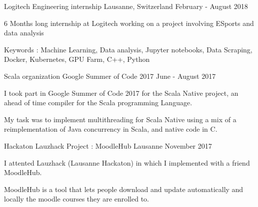 \begin{cventries}
	
	
	\cventry
	{Logitech} %
	{Engineering internship} %
	{Lausanne, Switzerland} %
	{February - August 2018} %
	{ %
		\begin{cvitems}
			\item {6 Months long internship at Logitech working on a project involving ESports and data analysis}
			\item {Keywords : Machine Learning, Data analysis, Jupyter notebooks, Data Scraping, Docker, Kubernetes, GPU Farm, C++, Python}
		\end{cvitems}
	}
	
	
	\cventry
	{Scala organization} %
	{Google Summer of Code 2017} %
	{} %
	{June - August 2017} %
	{ %
		\begin{cvitems}
			\item {I took part in Google Summer of Code 2017 for the Scala Native project, an ahead of time compiler for the Scala programming Language.}
			\item {My task was to implement multithreading for Scala Native using a mix of a reimplementation of Java concurrency in Scala, and native code in C.}
		\end{cvitems}
	}
	
	
	\cventry
	{Hackaton} %
	{Lauzhack Project : MoodleHub} %
	{Lausanne} %
	{November 2017} %
	{ %
		\begin{cvitems}
			\item {I attented Lauzhack (Lausanne Hackaton) in which I implemented with a friend MoodleHub.}
			\item {MoodleHub is a tool that lets people download and update automatically and locally the moodle courses they are enrolled to.}
		\end{cvitems}
	}
	
	
	

\end{cventries}
